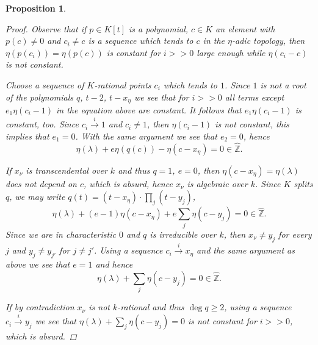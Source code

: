\documentclass[11pt]{amsart}
\theoremstyle{plain}
\newtheorem{lemma}[theorem]{Lemma}
\newtheorem{proposition}[theorem]{Proposition}
\theoremstyle{definition}
\newcommand{\1}{\mathbb{1}}
\newcommand{\hz}{\hat{\mathbb{Z}}}
\newcommand{\xar}{\xrightarrow}
\renewcommand{\hat}{\widehat}
\begin{document}
\begin{proposition}
\begin{proof}
		Observe that if $p\in K[t]$ is a polynomial, $c\in K$ an element with $p(c)\neq 0$ and $c_{i}\neq c$ is a sequence which tends to $c$ in the $\eta$-adic topology, then $\eta(p(c_{i}))=\eta(p(c))$ is constant for $i>>0$ large enough while $\eta(c_{i}-c)$ is \emph{not} constant.
		
		Choose a sequence of $K$-rational points $c_{i}$ which tends to $1$. Since $1$ is not a root of the polynomials $q$, $t-2$, $t-x_{\eta}$ we see that for $i>>0$ all terms except $e_{1}\eta(c_{i}-1)$ in the equation above are constant. It follows that $e_{1}\eta(c_{i}-1)$ is constant, too. Since $c_{i}\xar{i} 1$ and $c_{i}\neq 1$, then $\eta(c_{i}-1)$ is not constant, this implies that $e_{1}=0$. With the same argument we see that $e_{2}=0$, hence
		\[\eta(\lambda)+e\eta(q(c))-\eta(c-x_{\eta})=0\in\hz.\]
		
		If $x_{\nu}$ is transcendental over $k$ and thus $q=1$, $e=0$, then $\eta(c-x_{\eta})=\eta(\lambda)$ does not depend on $c$, which is absurd, hence $x_{\nu}$ is algebraic over $k$. Since $K$ splits $q$, we may write $q(t)=(t-x_{\eta})\cdot\prod_{j}(t-y_{j})$,
		\[\eta(\lambda)+(e-1)\eta(c-x_{\eta})+e\sum_{j}\eta(c-y_{j})=0\in\hz.\]
		Since we are in characteristic $0$ and $q$ is irreducible over $k$, then $x_{\nu}\neq y_{j}$ for every $j$ and $y_{j}\neq y_{j'}$ for $j\neq j'$. Using a sequence $c_{i}\xar{i}x_{\eta}$ and the same argument as above we see that $e=1$ and hence 
		\[\eta(\lambda)+\sum_{j}\eta(c-y_{j})=0\in\hz.\]
			
		If by contradiction $x_{\nu}$ is not $k$-rational and thus $\deg q\ge 2$, using a sequence $c_{i}\xar{i}y_{j}$ we see that $\eta(\lambda)+\sum_{j}\eta(c-y_{j})=0$ is not constant for $i>>0$, which is absurd.
	\end{proof}
\end{proposition}





	

		
\end{document}
